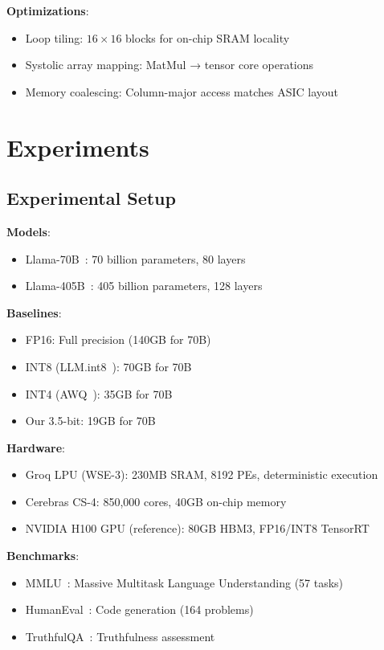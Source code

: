 \documentclass{article}
\begin{document}
\textbf{Optimizations}:
\begin{itemize}
    \item Loop tiling: $16 \times 16$ blocks for on-chip SRAM locality
    \item Systolic array mapping: MatMul → tensor core operations
    \item Memory coalescing: Column-major access matches ASIC layout
\end{itemize}

\section{Experiments}
\label{sec:experiments}

\subsection{Experimental Setup}

\textbf{Models}:
\begin{itemize}
    \item Llama-70B~\cite{touvron2023llama}: 70 billion parameters, 80 layers
    \item Llama-405B~\cite{meta2024llama3}: 405 billion parameters, 128 layers
\end{itemize}

\textbf{Baselines}:
\begin{itemize}
    \item FP16: Full precision (140GB for 70B)
    \item INT8 (LLM.int8~\cite{dettmers2022llm8bit}): 70GB for 70B
    \item INT4 (AWQ~\cite{lin2023awq}): 35GB for 70B
    \item Our 3.5-bit: 19GB for 70B
\end{itemize}

\textbf{Hardware}:
\begin{itemize}
    \item Groq LPU (WSE-3): 230MB SRAM, 8192 PEs, deterministic execution
    \item Cerebras CS-4: 850,000 cores, 40GB on-chip memory
    \item NVIDIA H100 GPU (reference): 80GB HBM3, FP16/INT8 TensorRT
\end{itemize}

\textbf{Benchmarks}:
\begin{itemize}
    \item MMLU~\cite{hendrycks2021mmlu}: Massive Multitask Language Understanding (57 tasks)
    \item HumanEval~\cite{chen2021humaneval}: Code generation (164 problems)
    \item TruthfulQA~\cite{lin2022truthfulqa}: Truthfulness assessment
\end{itemize}
\end{document}
